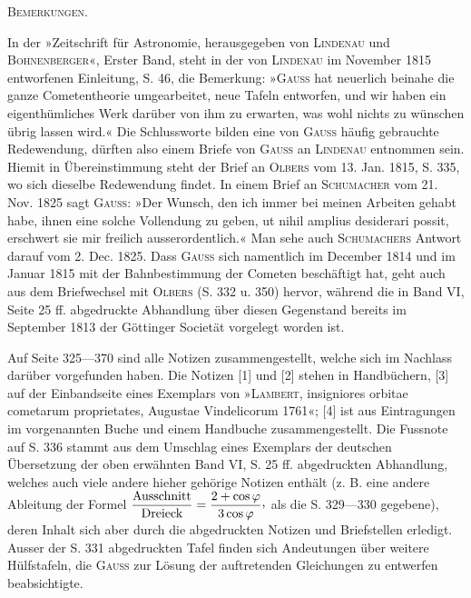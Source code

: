 \par\bigskip
\hypertarget{native-379-parabolic-remarks}{}\label{native-379-parabolic-remarks}
\begin{center}\textsc{Bemerkungen.}\end{center}
\begingroup\small
\noindent\hspace*{\parindent}In der »Zeitschrift für Astronomie, herausgegeben von \textsc{Lindenau} und \textsc{Bohnenberger}«, Erster Band, steht in der von \textsc{Lindenau} im November 1815 entworfenen Einleitung, S. 46, die Bemerkung: »\textsc{Gauss} hat neuerlich beinahe die ganze Cometentheorie umgearbeitet, neue Tafeln entworfen, und wir haben ein eigenthümliches Werk darüber von ihm zu erwarten, was wohl nichts zu wünschen übrig lassen wird.« Die Schlussworte bilden eine von \textsc{Gauss} häufig gebrauchte Redewendung, dürften also einem Briefe von \textsc{Gauss} an \textsc{Lindenau} entnommen sein. Hiemit in Übereinstimmung steht der Brief an \textsc{Olbers} vom 13. Jan. 1815, S. 335, wo sich dieselbe Redewendung findet. In einem Brief an \textsc{Schumacher} vom 21. Nov. 1825 sagt \textsc{Gauss}: »Der Wunsch, den ich immer bei meinen Arbeiten gehabt habe, ihnen eine solche Vollendung zu geben, ut nihil amplius desiderari possit, erschwert sie mir freilich ausserordentlich.« Man sehe auch \textsc{Schumachers} Antwort darauf vom 2. Dec. 1825. Dass \textsc{Gauss} sich namentlich im December 1814 und im Januar 1815 mit der Bahnbestimmung der Cometen beschäftigt hat, geht auch aus dem Briefwechsel mit \textsc{Olbers} (S. 332 u. 350) hervor, während die in Band VI, Seite 25 ff. abgedruckte Abhandlung über diesen Gegenstand bereits im September 1813 der Göttinger Societät vorgelegt worden ist.
\par
{}
\noindent\hspace*{\parindent}Auf Seite 325—370 sind alle Notizen zusammengestellt, welche sich im Nachlass darüber vorgefunden haben. Die Notizen [1] und [2] stehen in Handbüchern, [3] auf der Einbandseite eines Exemplars von »\textsc{Lambert}, insigniores orbitae cometarum proprietates, Augustae Vindelicorum 1761«; [4] ist aus Eintragungen im vorgenannten Buche und einem Handbuche zusammengestellt. Die Fussnote auf S. 336 stammt aus dem Umschlag eines Exemplars der deutschen Übersetzung der oben erwähnten Band VI, S. 25 ff. abgedruckten Abhandlung, welches auch viele andere hieher gehörige Notizen enthält (z. B. eine andere Ableitung der Formel \(\dfrac{\text{Ausschnitt}}{\text{Dreieck}}=\dfrac{2+\cos\varphi}{3\cos\varphi}\mathpunct{\text{\raisebox{.45ex}{,}}}\) als die S. 329—330 gegebene), deren Inhalt sich aber durch die abgedruckten Notizen und Briefstellen erledigt. Ausser der S. 331 abgedruckten Tafel finden sich Andeutungen über weitere Hülfstafeln, die \textsc{Gauss} zur Lösung der auftretenden Gleichungen zu entwerfen beabsichtigte.

